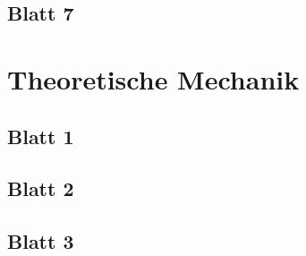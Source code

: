 \documentclass{tuftebook}
\numberwithin{Theorem}{chapter}
\theoremstyle{definition}
\theoremstyle{definition}
\begin{document}
\section{Blatt 7}


\chapter{Theoretische Mechanik}
\section{Blatt 1}

\section{Blatt 2}

\section{Blatt 3}

\end{document}
